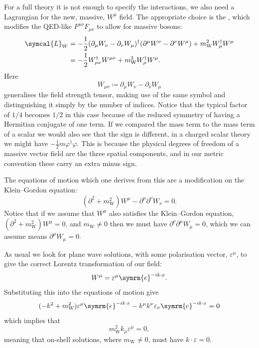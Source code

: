 \documentclass[fleqn]{NotesClass}
\newcommand{\Pparticle}[1]{\mathrm{#1}}
\newcommand{\PW}{\ensuremath{\Pparticle{W}}}
\newcommand{\e}{\symrm{e}}
\newcommand{\hermit}{\dagger}
\newcommand{\lagrangianDensity}{\symcal{L}}
\newcommand{\dalembertian}{\partial^2}
\begin{document}
    For a full theory it is not enough to specify the interactions, we also need a Lagrangian for the new, massive, \(W^\mu\) field.
    The appropriate choice is the , which modifies the QED-like \(F^{\mu\nu}F_{\mu\nu}\) to allow for massive bosons:
    \begin{align}
        \lagrangianDensity_{W} &= -\frac{1}{2}(\partial_\mu W_\nu - \partial_\nu W_\mu)^\hermit (\partial^\mu W^\nu - \partial^\nu W^\mu) + m_{\PW}^2 W_\mu^\hermit W^\mu\\
        &= -\frac{1}{2}W_{\mu\nu}^\hermit W^{\mu\nu} + m_{\PW}^2W_\mu^\hermit W^\mu.
    \end{align}
    Here
    \begin{equation}
        W_{\mu\nu} \coloneqq \partial_\mu W_\nu - \partial_\nu W_\mu
    \end{equation}
    generalises the field strength tensor, making use of the same symbol and distinguishing it simply by the number of indices.
    Notice that the typical factor of \(1/4\) becomes \(1/2\) in this case because of the reduced symmetry of having a Hermitian conjugate of one term.
    If we compared the mass term to the mass term of a scalar we would also see that the sign is different, in a charged scalar theory we might have \(-\tfrac{1}{2}m\varphi^\hermit \varphi\).
    This is because the physical degrees of freedom of a massive vector field are the three spatial components, and in our metric convention these carry an extra minus sign.
    
    The equations of motion which one derives from this are a modification on the Klein--Gordon equation:
    \begin{equation}
        (\dalembertian + m_{\PW}^2) W^\mu - \partial^\mu \partial^\nu W_\nu = 0.
    \end{equation}
    Notice that if we assume that \(W^\mu\) also satisfies the Klein--Gordon equation, \((\dalembertian + m_{\PW}^2)W^\mu = 0\), and \(m_{\PW} \ne 0\) then we must have \(\partial^\nu \partial^\mu W_\mu = 0\), which we can assume means \(\partial^\mu W_\mu = 0\).
    
    As usual we look for plane wave solutions, with some polarisation vector, \(\varepsilon^\mu\), to give the correct Lorentz transformation of our field:
    \begin{equation}
        W^\mu = \varepsilon^\mu\e^{-ik \cdot x}.
    \end{equation}
    Substituting this into the equations of motion give
    \begin{equation}
        (-k^2 + m_{\PW}^2)\varepsilon^\mu \e^{-ik\cdot x} - k^\mu k^\nu \varepsilon_\nu \e^{-ik\cdot x} = 0
    \end{equation}
    which implies that
    \begin{equation}
        m_{\PW}^2 k_\mu \varepsilon^\mu = 0,
    \end{equation}
    meaning that on-shell solutions, where \(m_{\PW} \ne 0\), must have \(k \cdot \varepsilon = 0\).
    
\end{document}
